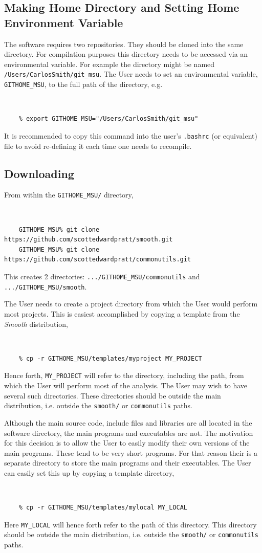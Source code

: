 \documentclass[UserManual.tex]{subfiles}
\begin{document}
\subsection{Making Home Directory and Setting Home Environment Variable}

The software requires two repositories. They should be cloned into the same directory. For compilation purposes this directory needs to be accessed via an environmental variable.  For example the directory might be named {\tt /Users/CarlosSmith/git\_msu}. The User needs to set an environmental variable, {\tt GITHOME\_MSU}, to the full path of the directory, e.g. 
{\tt
\begin{verbatim}
    % export GITHOME_MSU="/Users/CarlosSmith/git_msu"
\end{verbatim}
}
It is recommended to copy this command into the user's {\tt .bashrc} (or equivalent) file to avoid re-defining it each time one needs to recompile.

\subsection{Downloading}\label{sec:Downloading_Compiling}
From within the {\tt GITHOME\_MSU/} directory,
{\tt 
\begin{verbatim}
    GITHOME_MSU% git clone https://github.com/scottedwardpratt/smooth.git
    GITHOME_MSU% git clone https://github.com/scottedwardpratt/commonutils.git
\end{verbatim}
}

This creates 2 directories: {\tt .../GITHOME\_MSU/commonutils} and {\tt .../GITHOME\_MSU/smooth}.

The User needs to create a project directory from which the User would perform most projects. This is easiest accomplished by copying a template from the {\it Smooth} distribution,
{\tt
\begin{verbatim}
    % cp -r GITHOME_MSU/templates/myproject MY_PROJECT
\end{verbatim}
}
Hence forth, {\tt MY\_PROJECT} will refer to the directory, including the path, from which the User will perform most of the analysis. The User may wish to have several such directories. These directories should be outside the main distribution, i.e. outside the {\tt smooth/} or {\tt commonutils} paths. 

Although the main source code, include files and libraries are all located in the software directory, the main programs and executables are not. The motivation for this decision is to allow the User to easily modify their own versions of the main programs. These tend to be very short programs. For that reason their is a separate directory to store the main programs and their executables. The User can easily set this up by copying a template directory,
{\tt 
\begin{verbatim}
    % cp -r GITHOME_MSU/templates/mylocal MY_LOCAL
\end{verbatim}
}
Here {\tt MY\_LOCAL} will hence forth refer to the path of this directory. This directory should be outside the main distribution, i.e. outside the {\tt smooth/} or {\tt commonutils} paths. 
\end{document}
